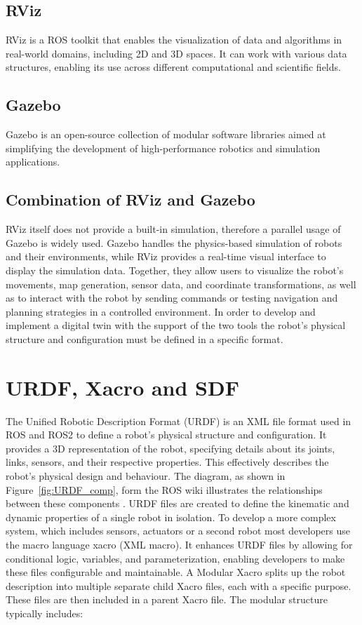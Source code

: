 \subsection{RViz}
RViz is a ROS toolkit that enables the visualization of data and algorithms in real-world domains, including 2D and 3D spaces. It can work with various data structures, enabling its use across different computational and scientific fields. \autocite{kamRVizToolkitReal2015}

\subsection{Gazebo}

Gazebo is an open-source collection of modular software libraries aimed at simplifying the development of high-performance robotics and simulation applications.\autocite{openroboticsGazebo}

\subsection{Combination of RViz and Gazebo}

RViz itself does not provide a built-in simulation, therefore a parallel usage of Gazebo is widely used. Gazebo handles the physics-based simulation of robots and their environments, while RViz provides a real-time visual interface to display the simulation data. Together, they allow users to visualize the robot's movements, map generation, sensor data, and coordinate transformations, as well as to interact with the robot by sending commands or testing navigation and planning strategies in a controlled environment.\autocite{indriAMRSystemAutonomous}
In order to develop and implement a digital twin with the support of the two tools the robot's physical structure and configuration must be defined in a specific format.

\section{URDF, Xacro and SDF}

The Unified Robotic Description Format (URDF) is an XML file format used in ROS and ROS2 to define a robot's physical structure and configuration. It provides a 3D representation of the robot, specifying details about its joints, links, sensors, and their respective properties. This effectively describes the robot's physical design and behaviour. The diagram, as shown in Figure~\ref{fig:URDF_comp}, form the ROS wiki illustrates the relationships between these components \autocite{openroboticsUrdfROSWiki}.
URDF files are created to define the kinematic and dynamic properties of a single robot in isolation. 
To develop a more complex system, which includes sensors, actuators or a second robot most developers use the macro language xacro (XML macro). It enhances URDF files by allowing for conditional logic, variables, and parameterization, enabling developers to make these files configurable and maintainable. 
A Modular Xacro splits up the robot description into multiple separate child Xacro files, each with a specific purpose. These files are then included in a parent Xacro file. The modular structure typically includes:

